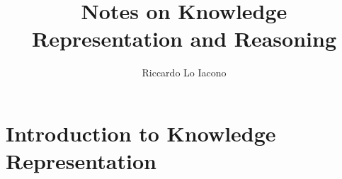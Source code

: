 \documentclass[moon, draft]{lectures2}
\title{Notes on Knowledge Representation and Reasoning}
\author{Riccardo Lo Iacono}
\begin{document}
    \maketitle 

    \section{Introduction to Knowledge Representation}
    
\end{document}
